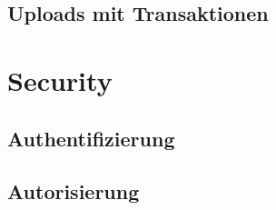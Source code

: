 \subsection{Uploads mit Transaktionen}



\section{Security}

\subsection{Authentifizierung}


\subsection{Autorisierung}


